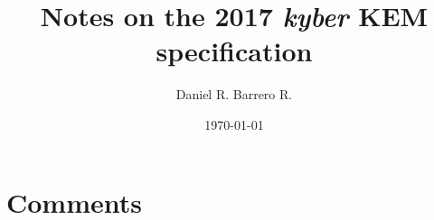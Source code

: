 \documentclass{amsart}
\title{Notes on the 2017 \emph{kyber} KEM specification}
\author{Daniel R. Barrero R.}
\date{\today}
\begin{document}
\maketitle

\section{}

\section{Comments}



%
\end{document}
